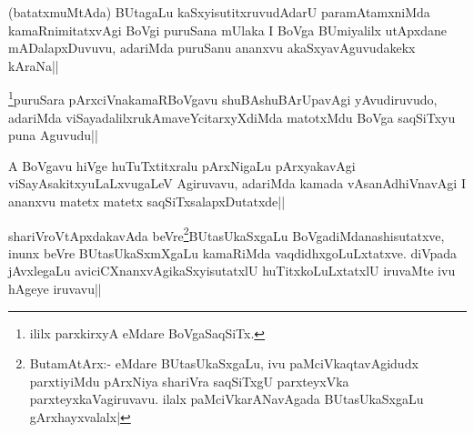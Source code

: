\begin{artha}
(batatxmuMtAda) BUtagaLu kaSxyisutitxruvudAdarU paramAtamxniMda kamaRnimitatxvAgi BoVgi puruSana mUlaka I BoVga BUmiyalilx utApxdane mADalapxDuvuvu, adariMda puruSanu ananxvu akaSxyavAguvudakekx kAraNa||
\end{artha}

\begin{artha}
\footnote[1]{ililx parxkirxyA eMdare BoVgaSaqSiTx.}puruSara pArxciVnakamaRBoVgavu shuBAshuBArUpavAgi yAvudiruvudo, adariMda viSayadalilxrukAmaveYcitarxyXdiMda matotxMdu BoVga saqSiTxyu puna Aguvudu||
\end{artha}

\begin{artha}
A BoVgavu hiVge huTuTxtitxralu pArxNigaLu pArxyakavAgi viSayAsakitxyuLaLxvugaLeV Agiruvavu, adariMda kamada vAsanAdhiVnavAgi I ananxvu matetx matetx saqSiTxsalapxDutatxde||
\end{artha}

\begin{artha}
shariVroVtApxdakavAda beVre\footnote[2]{ButamAtArx:- eMdare BUtasUkaSxgaLu, ivu paMciVkaqtavAgidudx parxtiyiMdu pArxNiya shariVra saqSiTxgU parxteyxVka parxteyxkaVagiruvavu. ilalx  paMciVkarANavAgada BUtasUkaSxgaLu gArxhayxvalalx|}BUtasUkaSxgaLu BoVgadiMdanashisutatxve, inunx beVre BUtasUkaSxmXgaLu kamaRiMda vaqdidhxgoLuLxtatxve. diVpada jAvxlegaLu aviciCXnanxvAgikaSxyisutatxlU huTitxkoLuLxtatxlU iruvaMte ivu hAgeye iruvavu||
\end{artha}
